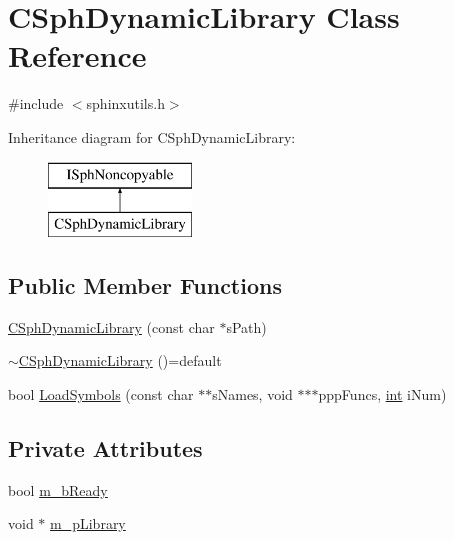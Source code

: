\hypertarget{classCSphDynamicLibrary}{\section{C\-Sph\-Dynamic\-Library Class Reference}
\label{classCSphDynamicLibrary}
}


{\ttfamily \#include $<$sphinxutils.\-h$>$}

Inheritance diagram for C\-Sph\-Dynamic\-Library\-:\begin{figure}[H]
\begin{center}
\leavevmode
\includegraphics[height=2.000000cm]{classCSphDynamicLibrary}
\end{center}
\end{figure}
\subsection*{Public Member Functions}
\begin{DoxyCompactItemize}
\item 
\hyperlink{classCSphDynamicLibrary_a79da878fd9de84d38e90edfe2d14d2d3}{C\-Sph\-Dynamic\-Library} (const char $\ast$s\-Path)
\item 
\hyperlink{classCSphDynamicLibrary_aadfd9bec67152f02d61f882db385d5b2}{$\sim$\-C\-Sph\-Dynamic\-Library} ()=default
\item 
bool \hyperlink{classCSphDynamicLibrary_a998ac43f87dc23ace6e98a26845edcaf}{Load\-Symbols} (const char $\ast$$\ast$s\-Names, void $\ast$$\ast$$\ast$ppp\-Funcs, \hyperlink{sphinxexpr_8cpp_a4a26e8f9cb8b736e0c4cbf4d16de985e}{int} i\-Num)
\end{DoxyCompactItemize}
\subsection*{Private Attributes}
\begin{DoxyCompactItemize}
\item 
bool \hyperlink{classCSphDynamicLibrary_a2ed3025e14fa03ddb75ce1ddd9c5f064}{m\-\_\-b\-Ready}
\item 
void $\ast$ \hyperlink{classCSphDynamicLibrary_a8ff8943170bce29fbfa4c9f5fde677f9}{m\-\_\-p\-Library}
\end{DoxyCompactItemize}


